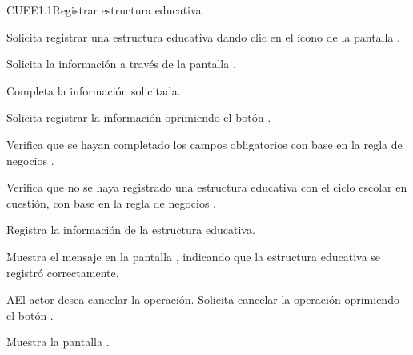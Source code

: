 \begin{UseCase}{CUEE1.1}{Registrar estructura educativa}
{\begin{UClist}
			\UCli {} 
		\end{UClist}
	}
\end{UseCase}

\begin{UCtrayectoria}
	\UCpaso [\UCactor] Solicita registrar una estructura educativa dando clic en el ícono \btnRegistrar de la pantalla . 
	
	\UCpaso [\UCsist] Solicita la información a través de la pantalla .
	
	\UCpaso [\UCactor] Completa la información solicitada. \label{CUEE1.1:CompletaInfo}
	
	\UCpaso [\UCactor] Solicita registrar la información oprimiendo el botón . 
	
	\UCpaso [\UCsist] Verifica que se hayan completado los campos obligatorios con base en la regla de negocios . 
	
	\UCpaso [\UCsist] Verifica que no se haya registrado una estructura educativa con el ciclo escolar en cuestión, con base en la regla de negocios . 
	
	\UCpaso [\UCsist] Registra la información de la estructura educativa.
	
	\UCpaso [\UCsist] Muestra el mensaje  en la pantalla , indicando que la estructura educativa se registró correctamente.	
	
\end{UCtrayectoria}


\begin{UCtrayectoriaA}{A}{El actor desea cancelar la operación.}
	\UCpaso [\UCactor] Solicita cancelar la operación oprimiendo el botón .
	
	\UCpaso [\UCsist] Muestra la pantalla . 
\end{UCtrayectoriaA}

